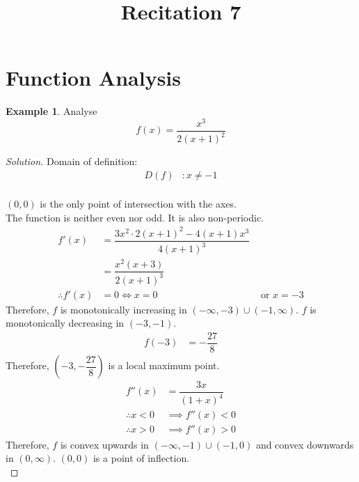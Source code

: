 \documentclass[fleqn, 12pt]{article}
\title{Recitation 7}
\author{}
\date{\formatdate{10}{12}{2014}}
\theoremstyle{definition}
\newtheorem{example}{Example}
\theoremstyle{theorem}
\newenvironment{solution}
{\begin{proof}[Solution]\let\qed\relax}
	{\end{proof}}
\begin{document}
\maketitle

\tableofcontents

\newpage
\section{Function Analysis}

\begin{example}
	Analyse
	\begin{equation*}
		f(x) = \dfrac{x^3}{2(x + 1)^2}
	\end{equation*}
\end{example}

\begin{solution}
	Domain of definition:
	\begin{align*}
		D(f) &: x \neq -1\\
	\end{align*}
	
	$(0,0)$ is the only point of intersection with the axes.\\
	
	The function is neither even nor odd. It is also non-periodic.\\
	
	\begin{align*}
		f'(x) &= \dfrac{3x^2 \cdot 2(x + 1)^2 - 4 (x + 1) x^3}{4 (x + 1)^3}\\
		&= \dfrac{x^2 (x + 3)}{2 (x + 1)^3}\\
		\therefore f'(x) &= 0 \iff x = 0 &\text{ or } x = -3
	\end{align*}
	Therefore, $f$ is monotonically increasing in $(-\infty, -3) \cup (-1, \infty)$. $f$ is monotonically decreasing in $(-3, -1)$.
	\begin{align*}
		f(-3) &= -\dfrac{27}{8}
	\end{align*}
	Therefore, $\left( -3, -\dfrac{27}{8} \right)$ is a local maximum point.\\

	\begin{align*}
		f''(x) &= \dfrac{3x}{(1 + x)^4}\\
		\therefore x < 0 &\implies f''(x) < 0\\
		\therefore x > 0 &\implies f''(x) > 0
	\end{align*}
	Therefore, $f$ is convex upwards in $(- \infty, -1) \cup (-1, 0)$ and convex downwards in $(0, \infty)$. $(0,0)$ is a point of inflection.\\
	

\end{solution}
\end{document}
